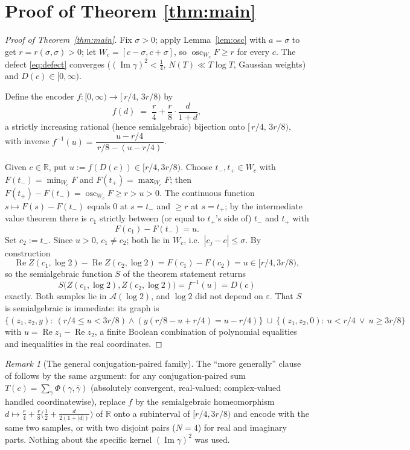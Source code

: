 \documentclass[11pt]{amsart}
\theoremstyle{definition}
\theoremstyle{remark}
\newtheorem{remark}[theorem]{Remark}
\newcommand{\RR}{\mathbb{R}}
\DeclareMathOperator{\Rre}{Re}
\DeclareMathOperator{\Iim}{Im}
\DeclareMathOperator{\osc}{osc}
\begin{document}
\section{Proof of Theorem \ref{thm:main}}\label{sec:proof}

\begin{proof}[Proof of Theorem~\ref{thm:main}]
Fix $\sigma>0$; apply Lemma~\ref{lem:osc} with $a=\sigma$ to get $r=r(\sigma,\sigma)>0$; let $W_c=[c-\sigma,c+\sigma]$, so $\osc_{W_c}F\ge r$ for every $c$. The defect \eqref{eq:defect} converges ($(\Iim\gamma)^2<\tfrac14$, $N(T)\ll T\log T$, Gaussian weights) and $D(c)\in[0,\infty)$.

Define the encoder $f:[0,\infty)\to[\,r/4,\,3r/8)$ by
\[
f(d)\;=\;\frac r4+\frac r8\cdot\frac{d}{1+d},
\]
a strictly increasing rational (hence semialgebraic) bijection onto $[\,r/4,\,3r/8)$, with inverse $f^{-1}(u)=\dfrac{u-r/4}{\,r/8-(u-r/4)\,}$.

Given $c\in\RR$, put $u:=f(D(c))\in[r/4,3r/8)$. Choose $t_-,t_+\in W_c$ with $F(t_-)=\min_{W_c}F$ and $F(t_+)=\max_{W_c}F$; then $F(t_+)-F(t_-)=\osc_{W_c}F\ge r>u>0$. The continuous function $s\mapsto F(s)-F(t_-)$ equals $0$ at $s=t_-$ and $\ge r$ at $s=t_+$; by the intermediate value theorem there is $c_1$ strictly between (or equal to $t_+$'s side of) $t_-$ and $t_+$ with
\[
F(c_1)-F(t_-)=u .
\]
Set $c_2:=t_-$. Since $u>0$, $c_1\ne c_2$; both lie in $W_c$, i.e.\ $|c_j-c|\le\sigma$. By construction
\[
\Rre Z(c_1,\log2)-\Rre Z(c_2,\log2)=F(c_1)-F(c_2)=u\in[r/4,3r/8),
\]
so the semialgebraic function $S$ of the theorem statement returns
\[
S\big(Z(c_1,\log2),Z(c_2,\log2)\big)=f^{-1}(u)=D(c)
\]
exactly. Both samples lie in $\mathcal A(\log2)$, and $\log2$ did not depend on $\varepsilon$. That $S$ is semialgebraic is immediate: its graph is $\{(z_1,z_2,y):\ (r/4\le u<3r/8)\wedge(y(r/8-u+r/4)=u-r/4)\}\ \cup\ \{(z_1,z_2,0):\ u<r/4\ \vee\ u\ge3r/8\}$ with $u=\Rre z_1-\Rre z_2$, a finite Boolean combination of polynomial equalities and inequalities in the real coordinates.
\end{proof}

\begin{remark}[The general conjugation-paired family]\label{rem:family}
The ``more generally'' clause of \cite[Conj.~6.1]{SI} follows by the same argument: for any conjugation-paired sum $T(c)=\sum_\gamma\Phi(\gamma,\bar\gamma)$ (absolutely convergent, real-valued; complex-valued handled coordinatewise), replace $f$ by the semialgebraic homeomorphism $d\mapsto \frac r4+\frac r8\big(\frac12+\frac{d}{2(1+|d|)}\big)$ of $\RR$ onto a subinterval of $[r/4,3r/8)$ and encode with the same two samples, or with two disjoint pairs ($N=4$) for real and imaginary parts. Nothing about the specific kernel $(\Iim\gamma)^2$ was used.
\end{remark}
\end{document}
